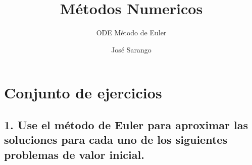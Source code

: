 \documentclass[
  letterpaper,
  DIV=11,
  numbers=noendperiod]{scrartcl}
\title{Métodos Numericos}
\subtitle{ODE Método de Euler}
\author{José Sarango}
\date{}
\renewcommand*\contentsname{Tabla de contenidos}
\newcommand\contentsname{Tabla de contenidos}
\begin{document}
\maketitle

\renewcommand*\contentsname{Tabla de Contenidos}
{
\hypersetup{linkcolor=}
\setcounter{tocdepth}{3}
\tableofcontents
}

\section{Conjunto de ejercicios}\label{conjunto-de-ejercicios}

\subsection{1. Use el método de Euler para aproximar las soluciones para
cada uno de los siguientes problemas de valor
inicial.}\label{use-el-muxe9todo-de-euler-para-aproximar-las-soluciones-para-cada-uno-de-los-siguientes-problemas-de-valor-inicial.}
\end{document}
